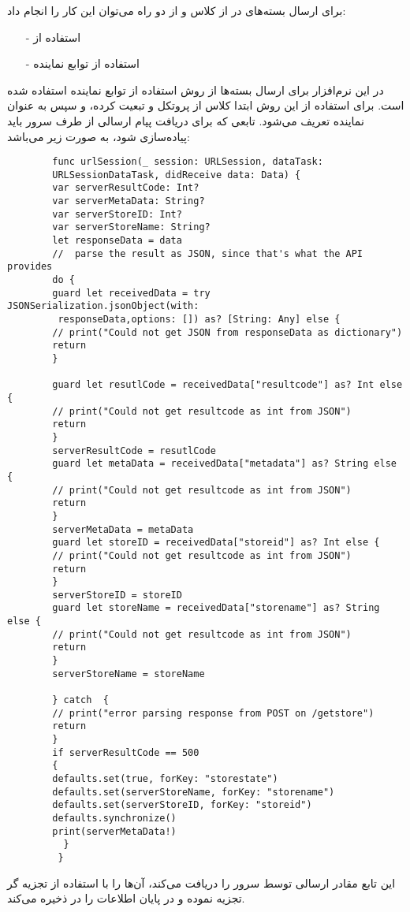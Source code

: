 \documentclass[oneside]{report}
\begin{document}
برای ارسال بسته‌های 
						{\normalsize {}}
	در 
							{\normalsize {}}
					از کلاس
											{\normalsize {}} 
						و	از دو راه می‌توان این کار را انجام داد:
\begin{itemize}
	\item[-]
	استفاده از 
							{\normalsize {}}
	\item[-]
	استفاده از توابع نماینده
\end{itemize}
	در این نرم‌افزار برای ارسال بسته‌ها از روش استفاده از توابع نماینده استفاده شده است. برای استفاده از این روش 
	ابتدا کلاس
							{\normalsize {}}
				از پروتکل 
										{\normalsize {}}
										و 
									{\normalsize {}}
				تبعیت کرده، و سپس به عنوان نماینده‌ تعریف می‌شود.
	تابعی که برای دریافت پیام ارسالی از طرف سرور باید پیاده‌سازی شود، به صورت زیر می‌باشد: 
	\begin{latin}
		\begin{verbatim}
		func urlSession(_ session: URLSession, dataTask: 
		URLSessionDataTask, didReceive data: Data) {
		var serverResultCode: Int?
		var serverMetaData: String?
		var serverStoreID: Int?
		var serverStoreName: String?
		let responseData = data
		//  parse the result as JSON, since that's what the API provides
		do {
		guard let receivedData = try JSONSerialization.jsonObject(with:
		 responseData,options: []) as? [String: Any] else {
		// print("Could not get JSON from responseData as dictionary")
		return
		}
		
		guard let resutlCode = receivedData["resultcode"] as? Int else {
		// print("Could not get resultcode as int from JSON")
		return
		}
		serverResultCode = resutlCode
		guard let metaData = receivedData["metadata"] as? String else {
		// print("Could not get resultcode as int from JSON")
		return
		}
		serverMetaData = metaData
		guard let storeID = receivedData["storeid"] as? Int else {
		// print("Could not get resultcode as int from JSON")
		return
		}
		serverStoreID = storeID
		guard let storeName = receivedData["storename"] as? String else {
		// print("Could not get resultcode as int from JSON")
		return
		}
		serverStoreName = storeName
		
		} catch  {
		// print("error parsing response from POST on /getstore")
		return
		}
		if serverResultCode == 500
		{
		defaults.set(true, forKey: "storestate")
		defaults.set(serverStoreName, forKey: "storename")
		defaults.set(serverStoreID, forKey: "storeid")
		defaults.synchronize()
		print(serverMetaData!)
		  }
		 }
		\end{verbatim}
		
	\end{latin}	
	این تابع مقادر ارسالی توسط سرور را دریافت می‌کند،  آن‌ها را با استفاده از تجزیه گر 
								{\normalsize {}}
								تجزیه نموده و در پایان اطلاعات را در 
															{\normalsize {}}
															ذخیره می‌کند. 
\end{document}
